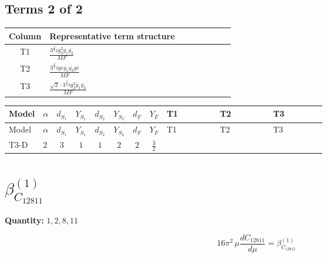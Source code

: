 \documentclass[8pt]{article}
\begin{document}
\begin{landscape}
\subsection*{Terms 2 of 2}
\begin{center}
\begin{tabular}{@{}c >{\raggedright\arraybackslash}p{0.82\linewidth}@{}}
\toprule
Column & Representative term structure \\
\midrule
T1 & \(\displaystyle \frac{3^{\frac{3}{4}} i g_{2}^{2} \overline{y_{1}} \overline{y_{2}}}{MF}\) \\
\midrule
T2 & \(\displaystyle \frac{3^{\frac{3}{4}} i ye \overline{y_{1}} \overline{y_{2}} \overline{ye}}{MF}\) \\
\midrule
T3 & \(\displaystyle \frac{\sqrt{2} \cdot 3^{\frac{3}{4}} i g_{2}^{2} \overline{y_{1}} \overline{y_{2}}}{MF}\) \\
\midrule
\bottomrule
\end{tabular}
\end{center}
\smallskip
\tiny
\begin{longtable}{@{}llcccccc >{\raggedright\arraybackslash}p{0.21\linewidth} >{\raggedright\arraybackslash}p{0.21\linewidth} >{\raggedright\arraybackslash}p{0.21\linewidth}@{}}
\toprule
Model & $\alpha$ & $d_{S_1}$ & $Y_{S_1}$ & $d_{S_2}$ & $Y_{S_2}$ & $d_F$ & $Y_F$ & T1 & T2 & T3 \\
\midrule
\endfirsthead
\toprule
Model & $\alpha$ & $d_{S_1}$ & $Y_{S_1}$ & $d_{S_2}$ & $Y_{S_2}$ & $d_F$ & $Y_F$ & T1 & T2 & T3 \\
\midrule
\endhead
T3-D & $2$ & $3$ & $1$ & $1$ & $2$ & $2$ & $\frac{3}{2}$ & \scriptsize\adjustbox{max width=\linewidth}{$\begin{gathered} \frac{25 \cdot 3^{\frac{3}{4}} i g_{2}^{2} \overline{y_{1}} \overline{y_{2}}}{24 MF}\end{gathered}$} & \scriptsize\adjustbox{max width=\linewidth}{$\begin{gathered} - \frac{3^{\frac{3}{4}} i ye \overline{y_{1}} \overline{y_{2}} \overline{ye}}{12 MF}\end{gathered}$} & \scriptsize\adjustbox{max width=\linewidth}{$\begin{gathered} \frac{\sqrt{2} \cdot 3^{\frac{3}{4}} i g_{2}^{2} \overline{y_{1}} \overline{y_{2}}}{6 MF}\end{gathered}$} \\
\midrule
\bottomrule
\end{longtable}
\clearpage
\section*{$\beta_{C_{12811}}^{(1)}$}
\noindent\textbf{Quantity: }$\mathrm{1,2,8,11}$\par\smallskip
\[16\pi^2\,\mu\frac{d C_{12811}}{d\mu}=\beta_{C_{12811}}^{(1)}\]

\end{landscape}
\end{document}
